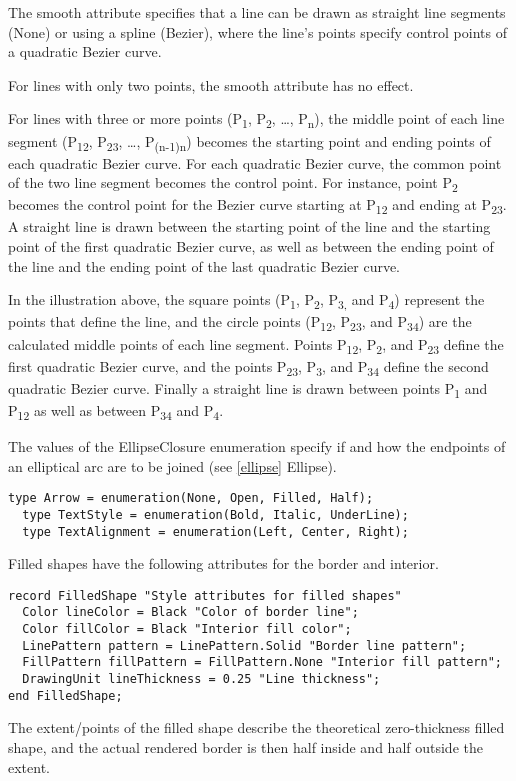 The smooth attribute specifies that a line can be drawn as straight line
segments (None) or using a spline (Bezier), where the line's points
specify control points of a quadratic Bezier curve.

For lines with only two points, the smooth attribute has no effect.

For lines with three or more points (P\textsubscript{1},
P\textsubscript{2}, \ldots{}, P\textsubscript{n}), the middle point of
each line segment (P\textsubscript{12}, P\textsubscript{23}, \ldots{},
P\textsubscript{(n-1)n}) becomes the starting point and ending points of
each quadratic Bezier curve. For each quadratic Bezier curve, the common
point of the two line segment becomes the control point. For instance,
point P\textsubscript{2} becomes the control point for the Bezier curve
starting at P\textsubscript{12} and ending at P\textsubscript{23}. A
straight line is drawn between the starting point of the line and the
starting point of the first quadratic Bezier curve, as well as between
the ending point of the line and the ending point of the last quadratic
Bezier curve.

In the illustration above, the square points (P\textsubscript{1},
P\textsubscript{2}, P\textsubscript{3,} and P\textsubscript{4})
represent the points that define the line, and the circle points
(P\textsubscript{12}, P\textsubscript{23}, and P\textsubscript{34}) are
the calculated middle points of each line segment. Points
P\textsubscript{12}, P\textsubscript{2}, and P\textsubscript{23} define
the first quadratic Bezier curve, and the points P\textsubscript{23},
P\textsubscript{3}, and P\textsubscript{34} define the second quadratic
Bezier curve. Finally a straight line is drawn between points
P\textsubscript{1} and P\textsubscript{12} as well as between
P\textsubscript{34} and P\textsubscript{4}.

The values of the EllipseClosure enumeration specify if and how the
endpoints of an elliptical arc are to be joined (see \ref{ellipse} Ellipse).

\begin{lstlisting}[language=modelica]
  type Arrow = enumeration(None, Open, Filled, Half);
  type TextStyle = enumeration(Bold, Italic, UnderLine);
  type TextAlignment = enumeration(Left, Center, Right);
\end{lstlisting}
Filled shapes have the following attributes for the border and interior.

\begin{lstlisting}[language=modelica]
record FilledShape "Style attributes for filled shapes"
  Color lineColor = Black "Color of border line";
  Color fillColor = Black "Interior fill color";
  LinePattern pattern = LinePattern.Solid "Border line pattern";
  FillPattern fillPattern = FillPattern.None "Interior fill pattern";
  DrawingUnit lineThickness = 0.25 "Line thickness";
end FilledShape;
\end{lstlisting}
The extent/points of the filled shape describe the theoretical
zero-thickness filled shape, and the actual rendered border is then half
inside and half outside the extent.

